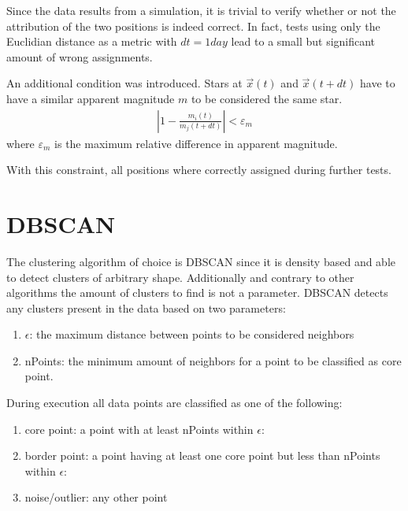 \documentclass[letterpaper,10pt,english]{sphinxmanual}
\begin{document}
\sphinxAtStartPar
Since the data results from a simulation, it is trivial to verify whether or not the attribution of the two positions is indeed correct.
In fact, tests using only the Euclidian distance as a metric with \(dt = 1 day\) lead to a small but significant amount of wrong assignments.

\sphinxAtStartPar
An additional condition was introduced. Stars at \(\vec{x}(t)\) and \(\vec{x}(t+dt)\) have to have a similar apparent magnitude \(m\) to be considered the same star.
\begin{equation*}
\begin{split}\left | 1-\frac{m_{i}\left ( t \right )}{m_{j}\left ( t+dt \right )} \right | < \varepsilon_{m}\end{split}
\end{equation*}
\sphinxAtStartPar
where \(\varepsilon_{m}\) is the maximum relative difference in apparent magnitude.

\sphinxAtStartPar
With this constraint, all positions where correctly assigned during further tests.


\section{DBSCAN}
\label{\detokenize{NBodySimulation/Clustering:dbscan}}
\sphinxAtStartPar
The clustering algorithm of choice is DBSCAN since it is density based and able to detect clusters of arbitrary shape.
Additionally and contrary to other algorithms the amount of clusters to find is not a parameter. DBSCAN detects any clusters present in the data based on two parameters:
\begin{enumerate}
%
\item {} 
\sphinxAtStartPar
\(\epsilon\): the maximum distance between points to be considered neighbors

\item {} 
\sphinxAtStartPar
nPoints: the minimum amount of neighbors for a point to be classified as core point.

\end{enumerate}

\sphinxAtStartPar
During execution all data points are classified as one of the following:
\begin{enumerate}
%
\item {} 
\sphinxAtStartPar
core point: a point with at least nPoints within \(\epsilon\):

\item {} 
\sphinxAtStartPar
border point: a point having at least one core point but less than nPoints within \(\epsilon\):

\item {} 
\sphinxAtStartPar
noise/outlier: any other point

\end{enumerate}
\end{document}
